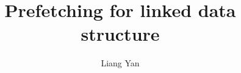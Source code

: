 \documentclass{acm_proc_article-sp}
\begin{document}
\title{Prefetching for linked data structure}

%
%
%
%
%

%
\author{
%
%
\alignauthor
Liang Yan \\%
       \\
       \\
}
\end{document}
